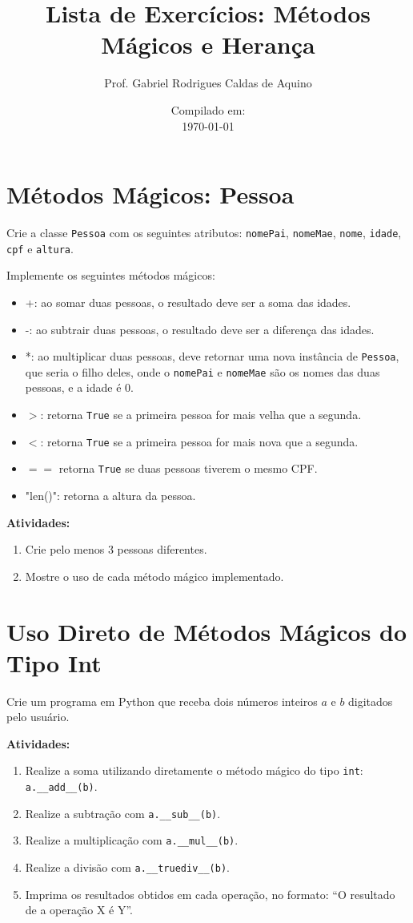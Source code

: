 \documentclass{article}
\title{Lista de Exercícios: Métodos Mágicos e Herança}
\author{Prof. Gabriel Rodrigues Caldas de Aquino}
\date{Compilado em: \\ \today}
\begin{document}
\maketitle


\section{Métodos Mágicos: Pessoa}
Crie a classe \texttt{Pessoa} com os seguintes atributos: \texttt{nomePai}, \texttt{nomeMae}, \texttt{nome}, \texttt{idade}, \texttt{cpf} e \texttt{altura}.

Implemente os seguintes métodos mágicos:

\begin{itemize}
    \item +: ao somar duas pessoas, o resultado deve ser a soma das idades.
    \item -: ao subtrair duas pessoas, o resultado deve ser a diferença das idades.
    \item *: ao multiplicar duas pessoas, deve retornar uma nova instância de \texttt{Pessoa}, que seria o filho deles, onde o \texttt{nomePai} e \texttt{nomeMae} são os nomes das duas pessoas, e a idade é 0.
    \item $>$: retorna \texttt{True} se a primeira pessoa for mais velha que a segunda.
    \item $<$: retorna \texttt{True} se a primeira pessoa for mais nova que a segunda.
    \item $==$ retorna \texttt{True} se duas pessoas tiverem o mesmo CPF.
    \item "len()": retorna a altura da pessoa.
\end{itemize}

\textbf{Atividades:}
\begin{enumerate}
    \item Crie pelo menos 3 pessoas diferentes.
    \item Mostre o uso de cada método mágico implementado.
\end{enumerate}


\section{Uso Direto de Métodos Mágicos do Tipo Int}

Crie um programa em Python que receba dois números inteiros $a$ e $b$ digitados pelo usuário.

\textbf{Atividades:}
\begin{enumerate}
    \item Realize a soma utilizando diretamente o método mágico do tipo \texttt{int}: \texttt{a.\_\_add\_\_(b)}.
    \item Realize a subtração com \texttt{a.\_\_sub\_\_(b)}.
    \item Realize a multiplicação com \texttt{a.\_\_mul\_\_(b)}.
    \item Realize a divisão com \texttt{a.\_\_truediv\_\_(b)}.
    \item Imprima os resultados obtidos em cada operação, no formato:
          “O resultado de a operação X é Y”.
\end{enumerate}
\end{document}
